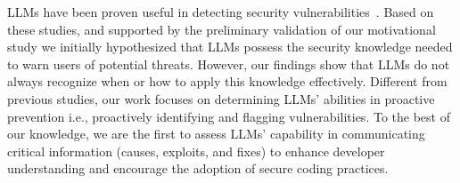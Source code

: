 LLMs have been proven useful in detecting security vulnerabilities~\cite{lu2024grace, zhou2024large, thapa2022transformer, yao2024survey}. Based on these studies, and supported by the preliminary validation of our motivational study we initially hypothesized that LLMs possess the security knowledge needed to warn users of potential threats. However, our findings show that LLMs do not always recognize when or how to apply this knowledge effectively. Different from previous studies, our work focuses on determining LLMs' abilities in proactive prevention i.e., proactively identifying and flagging vulnerabilities. To the best of our knowledge, we are the first to assess LLMs'  capability in communicating critical information (causes, exploits, and fixes) to enhance developer understanding and  encourage the adoption of secure coding practices. %




